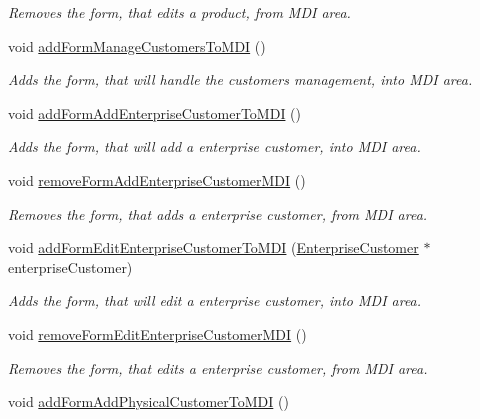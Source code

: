 \begin{DoxyCompactItemize}
\begin{DoxyCompactList}\small\item\em \-Removes the form, that edits a product, from \-M\-D\-I area. \end{DoxyCompactList}\item 
void \hyperlink{class_main_window_aebcd938992bd62969fb3640e7b6a5515}{add\-Form\-Manage\-Customers\-To\-M\-D\-I} ()
\begin{DoxyCompactList}\small\item\em \-Adds the form, that will handle the customers management, into \-M\-D\-I area. \end{DoxyCompactList}\item 
void \hyperlink{class_main_window_a49e317bd6163c5863de73f3c7f32a281}{add\-Form\-Add\-Enterprise\-Customer\-To\-M\-D\-I} ()
\begin{DoxyCompactList}\small\item\em \-Adds the form, that will add a enterprise customer, into \-M\-D\-I area. \end{DoxyCompactList}\item 
void \hyperlink{class_main_window_a028116b74e5a065518bffce1b5fa28ca}{remove\-Form\-Add\-Enterprise\-Customer\-M\-D\-I} ()
\begin{DoxyCompactList}\small\item\em \-Removes the form, that adds a enterprise customer, from \-M\-D\-I area. \end{DoxyCompactList}\item 
void \hyperlink{class_main_window_a3d0de47e591b651a51931bdd475e917d}{add\-Form\-Edit\-Enterprise\-Customer\-To\-M\-D\-I} (\hyperlink{class_enterprise_customer}{\-Enterprise\-Customer} $\ast$enterprise\-Customer)
\begin{DoxyCompactList}\small\item\em \-Adds the form, that will edit a enterprise customer, into \-M\-D\-I area. \end{DoxyCompactList}\item 
void \hyperlink{class_main_window_a72a91312a375c103c2346ff8263df3bd}{remove\-Form\-Edit\-Enterprise\-Customer\-M\-D\-I} ()
\begin{DoxyCompactList}\small\item\em \-Removes the form, that edits a enterprise customer, from \-M\-D\-I area. \end{DoxyCompactList}\item 
void \hyperlink{class_main_window_a101f06c27f79ed319cc78c0e55121149}{add\-Form\-Add\-Physical\-Customer\-To\-M\-D\-I} ()

\end{DoxyCompactItemize}

